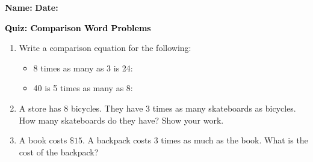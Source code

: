\documentclass[12pt, letterpaper, fleqn]{article}
\newcommand{\blanklong}{\underline{\hspace{6.5cm}}}
\begin{document}
\textbf{Name:} \underline{\hspace{5cm}}
\hfill
\textbf{Date:} \underline{\hspace{3cm}}\\

\begin{tcolorbox}[colback=customteal!20]
    \large\textcolor{black}{\textbf{Quiz: Comparison Word Problems}}
\end{tcolorbox}

\vspace{5mm}
\begin{enumerate}[itemsep=3cm, leftmargin=0.6cm]
\item Write a comparison equation for the following:
  \begin{itemize}[itemsep=0.8cm]
    \item 8 times as many as 3 is 24: \blanklong
    \item 40 is 5 times as many as 8: \blanklong
  \end{itemize}

\item A store has 8 bicycles. They have 3 times as many skateboards as bicycles. How many skateboards do they have? Show your work.
\vspace{3.5cm}

\item A book costs $\$15$. A backpack costs 3 times as much as the book. What is the cost of the backpack?
\end{enumerate}
\end{document}

